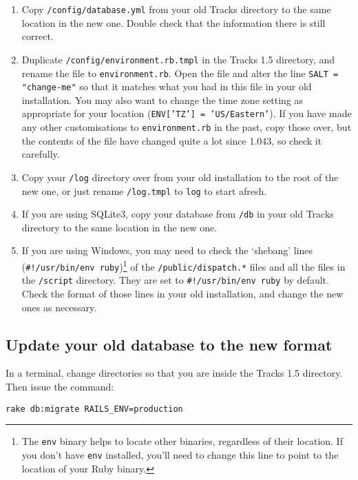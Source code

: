 \documentclass[10pt,twoside]{memoir}
\begin{document}
\begin{enumerate}


\item Copy \texttt{/config/database.yml} from your old Tracks directory to the same location in the new one. Double check that the information there is still correct.

\item Duplicate \texttt{/config/environment.rb.tmpl} in the Tracks 1.5 directory, and rename the file to \texttt{environment.rb}. Open the file and alter the line \texttt{SALT = "change-me"} so that it matches what you had in this file in your old installation. You may also want to change the time zone setting as appropriate for your location (\texttt{ENV['TZ'] = 'US/Eastern'}). If you have made any other customisations to \texttt{environment.rb} in the past, copy those over, but the contents of the file have changed quite a lot since 1.043, so check it carefully.

\item Copy your \texttt{/log} directory over from your old installation to the root of the new one, or just rename \texttt{/log.tmpl} to \texttt{log} to start afresh.

\item If you are using SQLite3, copy your database from \texttt{/db} in your old Tracks directory to the same location in the new one.

\item If you are using Windows, you may need to check the `shebang' lines (\texttt{\#!/usr/bin/env ruby})\footnote{The \texttt{env} binary helps to locate other binaries, regardless of their location. If you don't have \texttt{env} installed, you'll need to change this line to point to the location of your Ruby binary.} of the \texttt{/public/dispatch.*} files and all the files in the \texttt{/script} directory. They are set to \texttt{\#!/usr/bin/env ruby} by default. Check the format of those lines in your old installation, and change the new ones as necessary.
\end{enumerate}

\subsection{Update your old database to the new format}
\label{rake_upgrade}

In a terminal, change directories so that you are inside the Tracks 1.5 directory. Then issue the command:


\texttt{rake db:migrate RAILS\_ENV=production}
\end{document}
